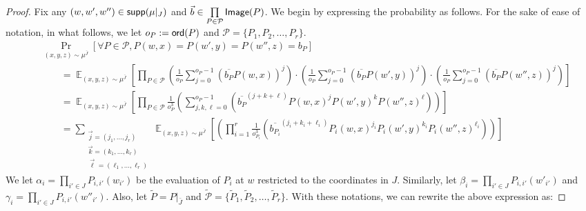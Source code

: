 \documentclass[11pt]{article}
\newcommand\Prob[2]{{\Pr_{#1}\left[ {#2} \right]}}
\newcommand\Expect[2]{{\mathop{\mathbb{E}}_{#1}\left[ {#2} \right]}}
\begin{document}
    \begin{proof}
      Fix any $(w, w', w'') \in {\sf supp}(\mu|_{J})$ and $\vec{b}\in\prod\limits_{P\in\mathcal{P}}{\sf Image}(P)$. We begin by expressing the probability as follows. For the sake of ease of notation, in what follows, we let $o_P:={\sf ord}(P)$ and $\mathcal{P} = \{ P_1, P_2, \ldots, P_r\}$.
      \begin{align*}
          &\Prob{(x,y,z)\sim\mu^{\bar{J}}}{\forall P\in \mathcal{P}, P(w,x)=P(w',y)=P(w'',z) = b_P} \\
          &\quad\quad= \Expect{(x,y,z)\sim\mu^{\bar{J}}}{\prod_{P\in \mathcal{P}}\left( \frac{1}{o_P} \sum_{j=0}^{o_P-1}\left(\overline{b_P}P(w,x)\right)^j\right)\cdot \left( \frac{1}{o_P} \sum_{j=0}^{o_P-1}\left(\overline{b_P}P(w',y)\right)^j\right)\cdot \left( \frac{1}{o_P} \sum_{j=0}^{o_P-1}\left(\overline{b_P}P(w'',z)\right)^j\right)}\\
          &\quad\quad= \Expect{(x,y,z)\sim\mu^{ \bar{J}}}{\prod_{P\in \mathcal{P}} \frac{1}{o_P^3}\left(  \sum_{j, k, \ell=0}^{o_P-1}\left(\overline{b_P}^{(j+k+\ell)}P(w,x)^j P(w',y)^k P(w'',z)^\ell\right)\right)}\\
         &\quad\quad= \sum_{\substack{\vec{j} = (j_1, \ldots, j_r) \\ \vec{k} = (k_1, \ldots, k_r) \\ \vec{\ell} = (\ell_1, \ldots, \ell_r)}}\Expect{(x,y,z)\sim\mu^{\bar{J}}}{\left(  \prod_{i=1}^r \frac{1}{o_{P_i}^3}\left(\overline{b_{P_i}}^{(j_i +k_i+\ell_i)} P_i(w,x)^{j_i} P_i(w',y)^{k_i} P_i(w'',z)^{\ell_i}\right)\right)}
         \end{align*}
We let $\alpha_i = \prod_{i'\in J} P_{i,i'}(w_{i'})$ be the evaluation of $P_i$ at $w$ restricted to the coordinates in $J$. Similarly, let  $\beta_i = \prod_{i'\in J} P_{i,i'}(w'_{i'})$ and  $\gamma_i = \prod_{i'\in J} P_{i,i'}(w''_{i'})$. Also, let $\tilde{P} = P|_{\bar{J}}$ and $\tilde{\mathcal{P}} = \{ \tilde{P}_1, \tilde{P}_2, \ldots, \tilde{P}_r\}$. With these notations, we can rewrite the above expression as:


\end{proof}
\end{document}
